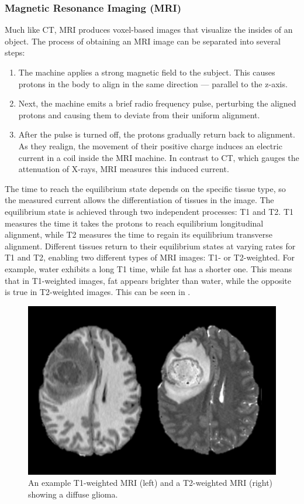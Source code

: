 \subsubsection{Magnetic Resonance Imaging (MRI)}

Much like CT, MRI produces voxel-based images that visualize the insides of an object. The process of obtaining an MRI image can be separated into several steps: 

\begin{enumerate}
	\item The machine applies a strong magnetic field to the subject. This causes protons in the body to align in the same direction --- parallel to the z-axis.
	\item Next, the machine emits a brief radio frequency pulse, perturbing the aligned protons and causing them to deviate from their uniform alignment.
	\item After the pulse is turned off, the protons gradually return back to alignment. As they realign, the movement of their positive charge induces an electric current in a coil inside the MRI machine. In contrast to CT, which gauges the attenuation of X-rays, MRI measures this induced current.
\end{enumerate}

The time to reach the equilibrium state depends on the specific tissue type, so the measured current allows the differentiation of tissues in the image. The equilibrium state is achieved through two independent processes: T1 and T2. T1 measures the time it takes the protons to reach equilibrium longitudinal alignment, while T2 measures the time to regain its equilibrium transverse alignment. Different tissues return to their equilibrium states at varying rates for T1 and T2, enabling two different types of MRI images: T1- or T2-weighted. For example, water exhibits a long T1 time, while fat has a shorter one. This means that in T1-weighted images, fat appears brighter than water, while the opposite is true in T2-weighted images. This can be seen in .

\begin{figure}[h]
 \centering
 \includegraphics[width=0.65\linewidth]{images/mri-t1-t2-example}
 \caption{An example T1-weighted MRI (left) and a T2-weighted MRI (right) showing a diffuse glioma. \cite{calabreseUniversityCaliforniaSan2022}}
 \label{fig:t1-t2-example}
 \end{figure}
 
